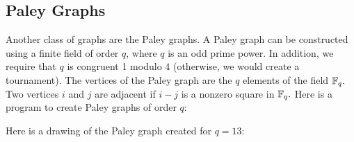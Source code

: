 \subsection{Paley Graphs}

Another class of graphs are the Paley graphs.
A Paley graph can be constructed using a finite field of order $q$, where 
$q$ is an odd prime power. 
In addition, we require that $q$ is congruent 1 modulo $4$ 
(otherwise, we would create a tournament). 
The vertices of the Paley graph are the $q$ elements 
of the field ${\mathbb F}_q.$
Two vertices $i$ and $j$ are adjacent if $i-j$ is a nonzero square in ${\mathbb F}_q.$ 
Here is a program to create Paley graphs of order $q$:


{\small
{\tt

}
}


Here is a drawing of the Paley graph created for $q=13$:
$$

$$



